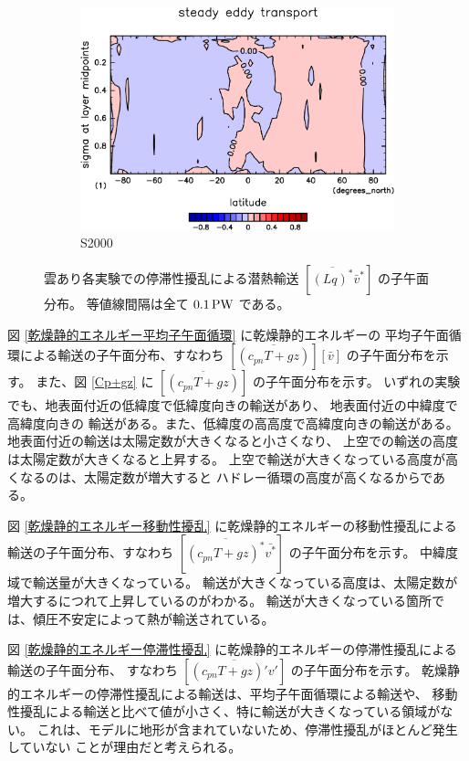 \documentclass[body]{subfiles}
\begin{document}
\begin{figure}[t]
\begin{subfigure}{.4\textwidth}
		\includegraphics[width=\textwidth]{S2000/MeriHeatTransTest@latentEn_SE,time=7300:7665-crop-rotate.pdf}
		\caption{S2000}\label{潜熱停滞性擾乱S2000}
	\end{subfigure}
	\caption[雲あり各実験でのに停滞性擾乱による潜熱輸送の子午面分布]{
		雲あり各実験での停滞性擾乱による潜熱輸送 \([\overline{(Lq)^*}\bar v^*]\) の子午面分布。
		等値線間隔は全て \(0.1\hmu{PW}\) である。
	}\label{潜熱停滞性擾乱}
\end{figure}

\afterpage{\clearpage}

図 \ref{乾燥静的エネルギー平均子午面循環} に乾燥静的エネルギーの
平均子午面循環による輸送の子午面分布、すなわち 
\([\overline{(c_{pn}T+gz)}][\bar v]\) の子午面分布を示す。
また、図 \ref{Cp+gz} に \([\overline{(c_{pn}T+gz)}]\) の子午面分布を示す。
いずれの実験でも、地表面付近の低緯度で低緯度向きの輸送があり、
地表面付近の中緯度で高緯度向きの
輸送がある。また、低緯度の高高度で高緯度向きの輸送がある。
地表面付近の輸送は太陽定数が大きくなると小さくなり、
上空での輸送の高度は太陽定数が大きくなると上昇する。
上空で輸送が大きくなっている高度が高くなるのは、太陽定数が増大すると
ハドレー循環の高度が高くなるからである。

図 \ref{乾燥静的エネルギー移動性擾乱} に乾燥静的エネルギーの移動性擾乱による
輸送の子午面分布、すなわち \([\overline{(c_{pn}T+gz)^*}\bar{v^*}]\) の子午面分布を示す。
中緯度域で輸送量が大きくなっている。
輸送が大きくなっている高度は、太陽定数が増大するにつれて上昇しているのがわかる。
輸送が大きくなっている箇所では、傾圧不安定によって熱が輸送されている。

図 \ref{乾燥静的エネルギー停滞性擾乱} に乾燥静的エネルギーの停滞性擾乱による輸送の子午面分布、
すなわち \([\overline{(c_{pn}T+gz)'v'}]\) の子午面分布を示す。
乾燥静的エネルギーの停滞性擾乱による輸送は、平均子午面循環による輸送や、
移動性擾乱による輸送と比べて値が小さく、特に輸送が大きくなっている領域がない。
これは、モデルに地形が含まれていないため、停滞性擾乱がほとんど発生していない
ことが理由だと考えられる。
\end{document}
